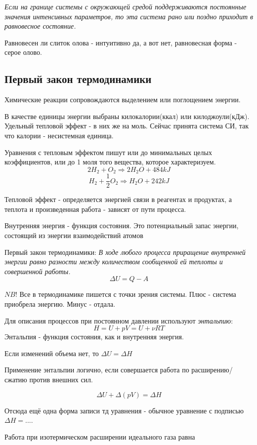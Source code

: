 \documentclass[11pt]{article}
\begin{document}
\emph{Если на границе системы с окружающей средой поддерживаются постоянные значения интенсивных параметров, то эта система рано или поздно приходит в равновесное состояние.}

Равновесен ли слиток олова - интуитивно да, а вот нет, равновесная форма - серое олово.

\subsection{Первый закон термодинамики}

Химические реакции сопровождаются выделением или поглощением энергии. 

В качестве единицы энергии выбраны килокалории(ккал) или килоджоули(кДж). Удельный тепловой эффект - в них же на моль. Сейчас принята система СИ, так что калории - несистемная единица.

Уравнения с тепловым эффектом пишут или до минимальных целых  коэффициентов, или до 1 моля того вещества, которое характеризуем.
$$2H_2 + O_2 \Rightarrow 2H_2O + 484 kJ$$
$$H_2 + \frac{1}{2}O_2 \Rightarrow H_2O + 242 kJ$$

Тепловой эффект - определяется энергией связи в реагентах и продуктах, а теплота и произведенная работа - зависят от пути процесса.

Внутренняя энергия - функция состояния. Это потенциальный запас энергии, состоящий из энергии взаимодействий атомов

Первый закон термодинамики:
\emph{В ходе любого процесса приращение внутренней энергии равно разности между количеством сообщенной ей теплоты и совершенной работы.}
$$\Delta U = Q - A$$

$NB!$ Все в термодинамике пишется с точки зрения системы. Плюс - система приобрела энергию. Минус - отдала.

Для описания процессов при постоянном давлении используют \emph{энтальпию}:
$$H = U+pV = U+\nu RT$$
Энтальпия - функция состояния, как и внутренняя энергия.

Если изменений объема нет, то $\Delta U = \Delta H$

Применение энтальпии логично, если совершается работа по расширению/сжатию против внешних сил. 

$$\Delta U + \Delta (pV) = \Delta H$$

Отсюда ещё одна форма записи тд уравнения - обычное уравнение с подписью $\Delta H = ...$.

Работа при изотермическом расширении идеального газа равна
\end{document}
